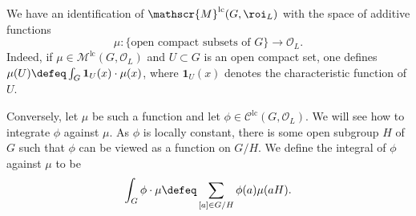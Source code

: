 \documentclass[a4paper,10pt, english, reqno]{smfart}
\newcommand{\sM}{\mathscr{M}}
\numberwithin{equation}{section}
\begin{document}
\begin{remark}\label{rem:additive functions on compact sets}
We have an identification of $\sM^{\mathrm{lc}}(G,\roi_L)$ with the space of additive functions 
\begin{equation}\label{eq:measures as additive functions}
	 \mu : \{\text{open compact subsets of $G$}\} \longrightarrow \mathscr{O}_L. 
	 \end{equation}
Indeed, if $\mu \in \mathscr{M}^{\mathrm{lc}}(G, \mathscr{O}_L)$ and $U \subset G$ is an open compact set, one defines $\mu(U) \defeq \int_G \mathbf{1}_U(x) \cdot \mu(x)$, where $\mathbf{1}_U(x)$ denotes the characteristic function of $U$.

Conversely, let $\mu$ be such a function and let $\phi \in \mathscr{C}^{\mathrm{lc}}(G, \mathscr{O}_L)$. We will see how to integrate $\phi$ against $\mu$. As $\phi$ is locally constant, there is some open subgroup $H$ of $G$ such that $\phi$ can be viewed as a function on $G/H$. We define the integral of $\phi$ against $\mu$ to be 
\[\int_{G}\phi \cdot \mu \defeq \sum_{[a] \in G/H}\phi(a)\mu(aH).\]
\end{remark}



\end{document}
